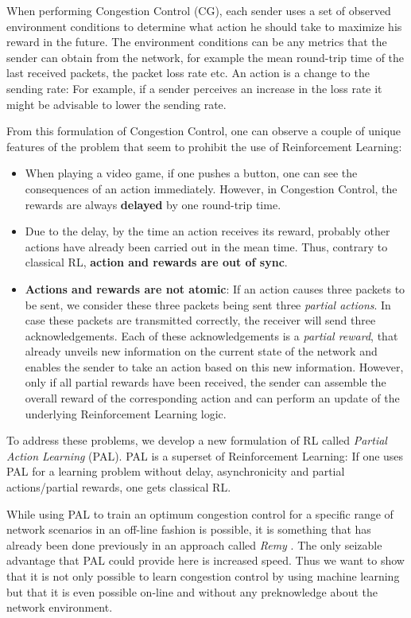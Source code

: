 \documentclass[sigconf]{acmart}
\begin{document}
When performing Congestion Control (CG), each sender uses a set of observed environment conditions to determine what action he should take to maximize his reward in the future. The environment conditions can be any metrics that the sender can obtain from the network, for example the mean round-trip time of the last received packets, the packet loss rate etc. An action is a change to the sending rate: For example, if a sender perceives an increase in the loss rate it might be advisable to lower the sending rate. 

From this formulation of Congestion Control, one can observe a couple of unique features of the problem that seem to prohibit the use of Reinforcement Learning: \begin{itemize}
\item When playing a video game, if one pushes a button, one can see the consequences of an action immediately. However, in Congestion Control, the rewards are always \textbf{delayed} by one round-trip time.
\item Due to the delay, by the time an action receives its reward, probably other actions have already been carried out in the mean time. Thus, contrary to classical RL, \textbf{action and rewards are out of sync}. 
\item \textbf{Actions and rewards are not atomic}: If an action causes three packets to be sent, we consider these three packets being sent three \textit{partial actions}. In case these packets are transmitted correctly, the receiver will send three acknowledgements. Each of these acknowledgements is a \textit{partial reward}, that already unveils new information on the current state of the network and enables the sender to take an action based on this new information. However, only if all partial rewards have been received, the sender can assemble the overall reward of the corresponding action and can perform an update of the underlying Reinforcement Learning logic. 
\end{itemize}

To address these problems, we develop a new formulation of RL called \textit{Partial Action Learning} (PAL). PAL is a superset of Reinforcement Learning: If one uses PAL for a learning problem without delay, asynchronicity and partial actions/partial rewards, one gets classical RL.

While using PAL to train an optimum congestion control for a specific range of network scenarios in an off-line fashion is possible, it is something that has already been done previously in an approach called \textit{Remy} \citep{winstein_tcp_2013}. The only seizable advantage that PAL could provide here is increased speed. Thus we want to show that it is  not only possible to learn congestion control by using machine learning but that it is even possible on-line and without any preknowledge about the network environment.
\end{document}

